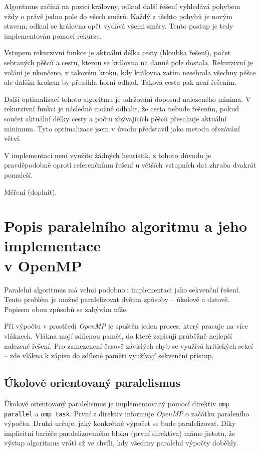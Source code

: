 \documentclass[czech]{article}
\begin{document}
Algoritmus začíná na pozici královny, odkud další řešení vyhledává pohybem vždy o právě jedno pole do všech směrů.
Každý z těchto pohybů je novým stavem, odkud se královna opět vydává všemi směry.
Tento postup je tedy implementován pomocí rekurze.

Vstupem rekurzivní funkce je aktuální délka cesty (hloubka řešení), počet sebraných pěšců a cestu, kterou se královna na danné pole dostala.
Rekurzivní je volání je ukončeno, v takovém kroku, kdy královna zatím nesebrala všechny pěšce ale dalším krokem by přesáhla horní odhad.
Taková cesta pak není řešením.

Další optimalizací tohoto algoritmu je udržování doposud nalezeného minima.
V rekurzivní funkci je následně možné odhalit, že cesta nebude řešením, pokud součet aktuální délky cesty a počtu zbývajících pěšců přesahuje aktuální minimum.
Tyto optimalizace jsem v úvodu představil jako metodu ořezávání větví.

V implementaci není využito žádných heuristik, z tohoto důvodu je pravděpodobně oproti referenčnímu řešení u větších vstupních dat zhruba dvakrát pomaleší.

Měření (doplnit).

\section{Popis paralelního algoritmu a jeho implementace\\v OpenMP}

Paralelní algoritmus má velmi podobnou implementaci jako sekvenční řešení.
Tento problém je možné paralelizovat dvěma způsoby -- úkolově a datově.
Popisem obou způsobů se zabývám níže.

Při výpočtu v prostředí \textit{OpenMP} je spuštěn jeden proces, který pracuje na více vláknech.
Vlákna mají sdílenou paměť, do které zapisují průběžně nejlepší nalezené řešení.
Pro zamezenení časově závislých chyb se využívá kritických sekcí -- zde vlákna k zápisu do sdílené paměti využívají sekvenční přístup.

\subsection{Úkolově orientovaný paralelismus}

Úkolově orientovaný paralelismus je implementovaný pomocí direktiv \texttt{omp parallel} a \texttt{omp task}.
První z direktiv informuje \textit{OpenMP} o začátku paraleního výpočtu.
Druhá určuje, jaký konkrétně výpočet se bude paralelizovat.
Díky implicitní bariéře paralelizovaného bloku (první direktiva) máme jistotu, že výstup algoritmus vrátí až ve chvíli, kdy všechny paralelní výpočty doběhly.
\end{document}
